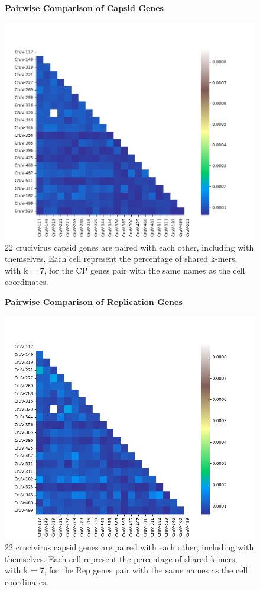 \documentclass[eng]{ajceam-class}
\begin{document}
\begin{figure}
    \centering
    \textbf{Pairwise Comparison of Capsid Genes}\par\medskip
    \includegraphics[scale=0.4]{PairwiseCPHeatmap.png}
    \caption{22 crucivirus capsid genes are paired with each other, including with themselves. Each cell represent the percentage of shared k-mers, with k = 7, for the CP genes pair with the same names as the cell coordinates.}
\end{figure}

\begin{figure}
    \centering
    \textbf{Pairwise Comparison of Replication Genes}\par\medskip
    \includegraphics[scale=0.4]{PairwiseRepHeatmap.png}
    \caption{22 crucivirus capsid genes are paired with each other, including with themselves. Each cell represent the percentage of shared k-mers, with k = 7, for the Rep genes pair with the same names as the cell coordinates.}
\end{figure}
\end{document}
